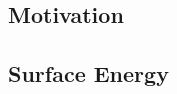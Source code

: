 %
%

\subsection{Motivation}\label{abnormal-grain-growth}



\subsection{Surface Energy}\label{surface-energy}


